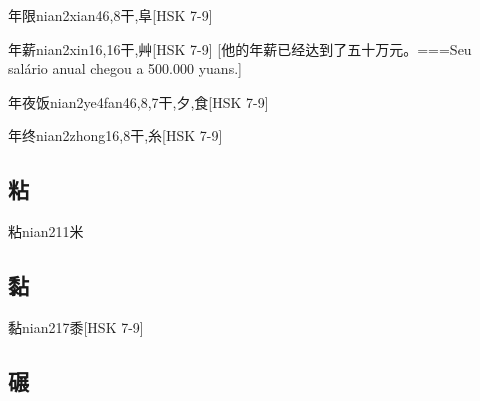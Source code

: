 \begin{EntryWithPhonetic}{年限}{nian2xian4}{6,8}{⼲,⾩}[HSK 7-9]
\end{EntryWithPhonetic}

\begin{EntryWithPhonetic}{年薪}{nian2xin1}{6,16}{⼲,⾋}[HSK 7-9]
  [他的年薪已经达到了五十万元。===Seu salário anual chegou a 500.000 yuans.]
\end{EntryWithPhonetic}

\begin{EntryWithPhonetic}{年夜饭}{nian2ye4fan4}{6,8,7}{⼲,⼣,⾷}[HSK 7-9]
\end{EntryWithPhonetic}

\begin{EntryWithPhonetic}{年终}{nian2zhong1}{6,8}{⼲,⽷}[HSK 7-9]
\end{EntryWithPhonetic}

\subsection*{粘}

\begin{EntryWithPhonetic}{粘}{nian2}{11}{⽶}
\end{EntryWithPhonetic}

\subsection*{黏}

\begin{EntryWithPhonetic}{黏}{nian2}{17}{⿉}[HSK 7-9]
\end{EntryWithPhonetic}

\subsection*{碾}

